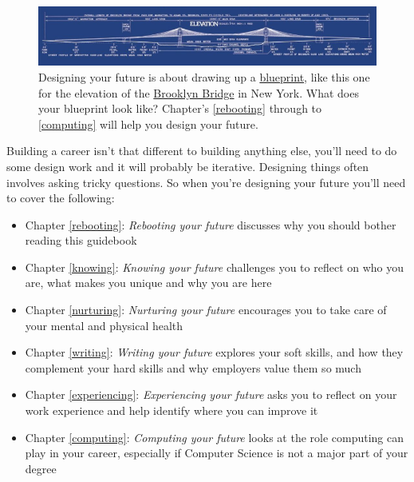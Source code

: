 \documentclass[
]{book}
\providecommand{\tightlist}{%
  \setlength{\itemsep}{0pt}\setlength{\parskip}{0pt}}
\begin{document}
\begin{figure}

{\centering \includegraphics[width=1\linewidth]{images/brooklyn-bridge-blueprint} 

}

\caption{Designing your future is about drawing up a \href{https://en.wikipedia.org/wiki/Blueprint}{blueprint}, like this one for the elevation of the \href{https://en.wikipedia.org/wiki/Brooklyn_Bridge}{Brooklyn Bridge} in New York. What does your blueprint look like? Chapter's \ref{rebooting} through to \ref{computing} will help you design your future.}\label{fig:brooklyn-fig}
\end{figure}



Building a career isn't that different to building anything else, you'll need to do some design work and it will probably be iterative. Designing things often involves asking tricky questions. So when you're designing your future you'll need to cover the following:

\begin{itemize}
\tightlist
\item
  Chapter \ref{rebooting}: \emph{Rebooting your future} discusses why you should bother reading this guidebook
\item
  Chapter \ref{knowing}: \emph{Knowing your future} challenges you to reflect on who you are, what makes you unique and why you are here
\item
  Chapter \ref{nurturing}: \emph{Nurturing your future} encourages you to take care of your mental and physical health
\item
  Chapter \ref{writing}: \emph{Writing your future} explores your soft skills, and how they complement your hard skills and why employers value them so much
\item
  Chapter \ref{experiencing}: \emph{Experiencing your future} asks you to reflect on your work experience and help identify where you can improve it
\item
  Chapter \ref{computing}: \emph{Computing your future} looks at the role computing can play in your career, especially if Computer Science is not a major part of your degree
\end{itemize}
\end{document}
